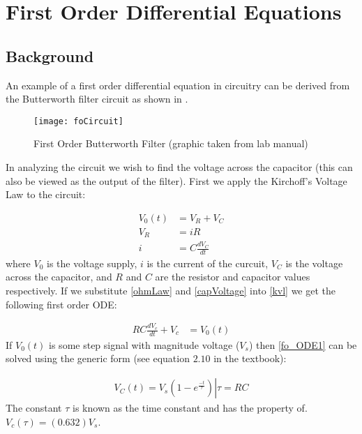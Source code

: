 \documentclass[main.tex]{subfile}
\begin{document}
\section{First Order Differential Equations}
\label{sec:foAnalysis}

\subsection{Background}
\label{sec:fo_analytical_view}

An example of a first order differential equation in circuitry can be derived
from the Butterworth filter circuit as shown in .

\begin{figure}[H]
	\begin{center}
		\texttt{[image: foCircuit]}
	\end{center}
	\caption{First Order Butterworth Filter (graphic taken from lab manual)}
	\label{fig:foCircuit}
\end{figure}

In analyzing the circuit we wish to find the voltage across the capacitor (this
can also be viewed as the output of the filter). First we apply the Kirchoff's
Voltage Law to the circuit:

\begin{align}
	V_0(t) &= V_R + V_C \label{eq:kvl}
	\\V_R &= iR \label{eq:ohmLaw}
	\\i &= C\frac{dV_C}{dt} \label{eq:capVoltage}
\end{align}
where $V_0$ is the voltage supply, $i$ is the current of the curcuit, $V_C$ is
the voltage across the capacitor, and $R$ and $C$ are the resistor and capacitor
values respectively. If we substitute \eqref{ohmLaw} and \eqref{capVoltage} into
\eqref{kvl} we get the following first order ODE:

\begin{align}
	RC\frac{dV_c}{dt} + V_c &= V_0(t) \label{eq:fo_ODE1}
\end{align}
If $V_0(t)$ is some step signal with magnitude voltage ($V_s$) then
\eqref{fo_ODE1} can be solved using the generic form (see equation $2.10$ in the
textbook):

\begin{align}
	V_C(t) = \left. V_s(1 - e^{\frac{-t}{\tau}}) \right| \tau = RC \label{eq:fo_Vc}
\end{align}
The constant $\tau$ is known as the time constant and has the property of.
$V_c(\tau) = (0.632)V_s$.
\end{document}
